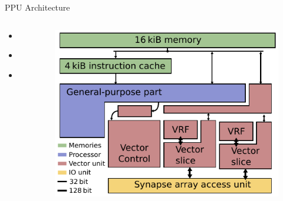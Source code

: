 \documentclass[10pt,aspectratio=169]{beamer}
\begin{document}
\begin{frame}{PPU Architecture}
    \begin{columns}[c]
    \begin{column}{0.5\textwidth}
        \begin{itemize}
            \item \begin{center}\end{center}
            \item \begin{center}\end{center}
            \item \begin{center}\end{center}
        \end{itemize}
    \end{column}

    \begin{column}{0.5\textwidth}
        \centering
        \begin{figure}
            \includegraphics[width=.8\textwidth]{pictures/nux.pdf}
        \end{figure}
    \end{column}
    \end{columns}

\end{frame}
\end{document}
